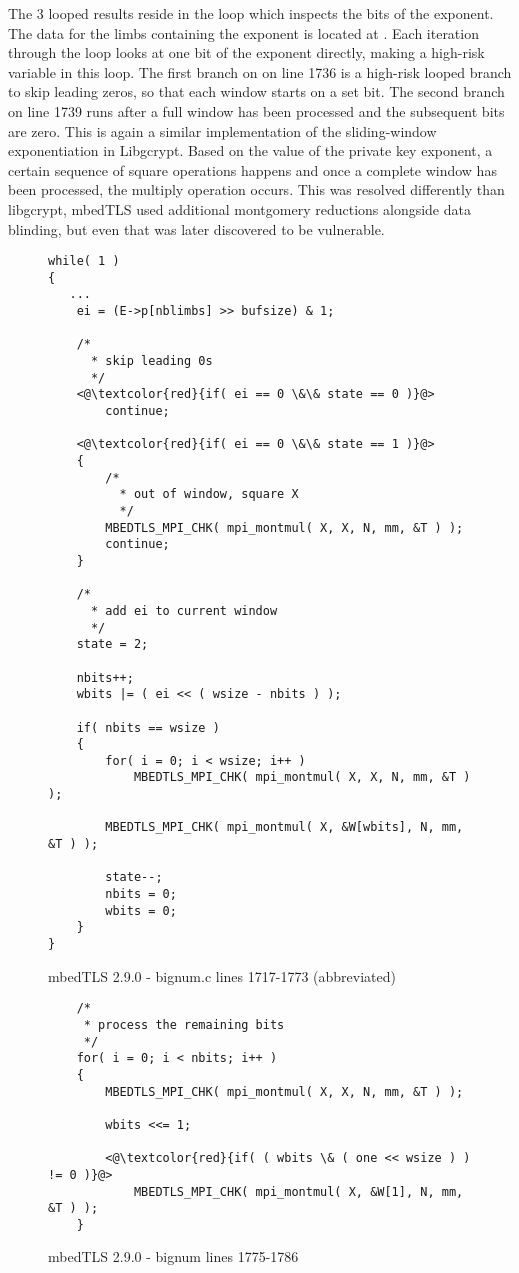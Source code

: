 The 3 looped results reside in the loop which inspects the bits of the exponent.
The data for the limbs containing the exponent is located at . Each
iteration through the loop looks at one bit of the exponent directly, making
 a high-risk variable in this loop. The first branch on  on line 1736 is
a high-risk looped branch to skip leading zeros, so that each window starts on a
set bit. The second branch on line 1739 runs after a full window has been
processed and the subsequent bits are zero. This is again a similar
implementation of the sliding-window exponentiation in Libgcrypt. Based on the
value of the private key exponent, a certain sequence of square operations
happens and once a complete window has been processed, the multiply operation
occurs. This was resolved differently than libgcrypt, mbedTLS used additional
montgomery reductions alongside data blinding\cite{schindler2000timing}, but even that was later
discovered to be vulnerable\cite{walter2001distinguishing}.

\begin{figure}[h!]
\begin{lstlisting}
while( 1 )
{
   ...
    ei = (E->p[nblimbs] >> bufsize) & 1;

    /*
      * skip leading 0s
      */
    <@\textcolor{red}{if( ei == 0 \&\& state == 0 )}@>
        continue;

    <@\textcolor{red}{if( ei == 0 \&\& state == 1 )}@>
    {
        /*
          * out of window, square X
          */
        MBEDTLS_MPI_CHK( mpi_montmul( X, X, N, mm, &T ) );
        continue;
    }

    /*
      * add ei to current window
      */
    state = 2;

    nbits++;
    wbits |= ( ei << ( wsize - nbits ) );

    if( nbits == wsize )
    {
        for( i = 0; i < wsize; i++ )
            MBEDTLS_MPI_CHK( mpi_montmul( X, X, N, mm, &T ) );

        MBEDTLS_MPI_CHK( mpi_montmul( X, &W[wbits], N, mm, &T ) );

        state--;
        nbits = 0;
        wbits = 0;
    }
}
\end{lstlisting}
\caption{mbedTLS 2.9.0 - bignum.c lines 1717-1773 (abbreviated)}
\label{mbedtls:squareonzero}
\end{figure}

\begin{figure}
  \begin{lstlisting}
    /*
     * process the remaining bits
     */
    for( i = 0; i < nbits; i++ )
    {
        MBEDTLS_MPI_CHK( mpi_montmul( X, X, N, mm, &T ) );

        wbits <<= 1;

        <@\textcolor{red}{if( ( wbits \& ( one << wsize ) ) != 0 )}@>
            MBEDTLS_MPI_CHK( mpi_montmul( X, &W[1], N, mm, &T ) );
    }
  \end{lstlisting}
  \caption{mbedTLS 2.9.0 - bignum lines 1775-1786}
  \label{mbedtls:wbitshighrisk}
\end{figure}

